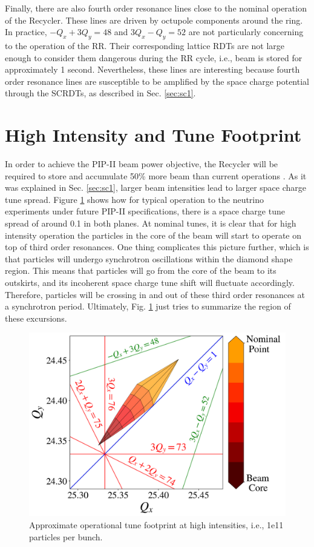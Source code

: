 Finally, there are also fourth order resonance lines close to the nominal operation of the Recycler. These lines are driven by octupole components around the ring. In practice, $-Q_x+3Q_y = 48$ and $3Q_x-Q_y = 52$ are not particularly concerning to the operation of the RR. Their corresponding lattice RDTs are not large enough to consider them dangerous during the RR cycle, i.e., beam is stored for approximately 1 second. Nevertheless, these lines are interesting because fourth order resonance lines are susceptible to be amplified by the space charge potential through the SCRDTs, as described in Sec. \ref{sec:sc1}.    

\section{High Intensity and Tune Footprint}

In order to achieve the PIP-II beam power objective, the Recycler will be required to store and accumulate 50\% more beam than current operations \cite{pipII1}. As it was explained in Sec. \ref{sec:sc1}, larger beam intensities lead to larger space charge tune spread. Figure \ref{fig:rrtdhigh} shows how for typical operation to the neutrino experiments under future PIP-II specifications, there is a space charge tune spread of around 0.1 in both planes. At nominal tunes, it is clear that for high intensity operation the particles in the core of the beam will start to operate on top of third order resonances. One thing complicates this picture further, which is that particles will undergo synchrotron oscillations within the diamond shape region. This means that particles will go from the core of the beam to its outskirts, and its incoherent space charge tune shift will fluctuate accordingly. Therefore, particles will be crossing in and out of these third order resonances at a synchrotron period. Ultimately, Fig. \ref{fig:rrtdhigh} just tries to summarize the region of these excursions.  

\begin{figure}[H]
   \centering
   \includegraphics[width=\columnwidth]{chapter3/rrtdhigh.png}
   \caption{Approximate operational tune footprint at high intensities, i.e., 1e11 particles per bunch.}
   \label{fig:rrtdhigh}
\end{figure}

